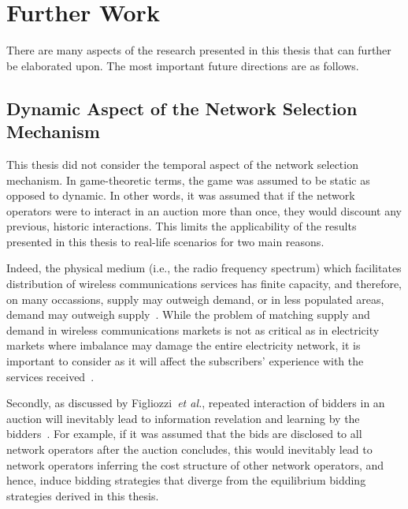 \section{Further Work} %
\label{sec:further_work_conclusions}
There are many aspects of the research presented in this thesis that can further be elaborated upon. The most important future directions are as follows.

\subsection{Dynamic Aspect of the Network Selection Mechanism}
\label{sub:dynamic_aspect_of_the_network_selection_mechanism}
This thesis did not consider the temporal aspect of the network selection mechanism. In game-theoretic terms, the game was assumed to be static as opposed to dynamic. In other words, it was assumed that if the network operators were to interact in an auction more than once, they would discount any previous, historic interactions. This limits the applicability of the results presented in this thesis to real-life scenarios for two main reasons.

 Indeed, the physical medium (i.e., the radio frequency spectrum) which facilitates distribution of wireless communications services has finite capacity, and therefore, on many occassions, supply may outweigh demand, or in less populated areas, demand may outweigh supply~\cite{LeCadre2009}. While the problem of matching supply and demand in wireless communications markets is not as critical as in electricity markets where imbalance may damage the entire electricity network, it is important to consider as it will affect the subscribers' experience with the services received~\cite{Lincoln2011}.

Secondly, as discussed by Figliozzi~\emph{et al.}, repeated interaction of bidders in an auction will inevitably lead to information revelation and learning by the bidders~\cite{FigliozziJaillet2008}. For example, if it was assumed that the bids are disclosed to all network operators after the auction concludes, this would inevitably lead to network operators inferring the cost structure of other network operators, and hence, induce bidding strategies that diverge from the equilibrium bidding strategies derived in this thesis.


